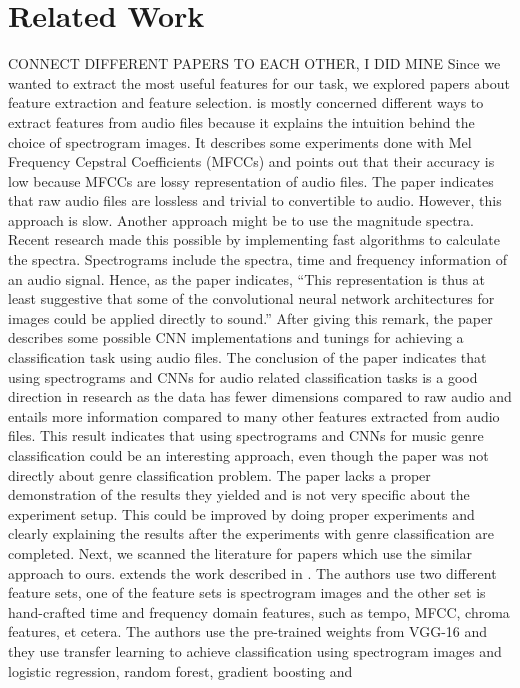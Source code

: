 \documentclass[acmtog, authorversion]{acmart}
\begin{document}
\section{Related Work}
CONNECT DIFFERENT PAPERS TO EACH OTHER, I DID MINE
Since we wanted to extract the most useful features for our task, we explored papers about feature extraction and feature selection. \cite{wyse2017audio} 
is mostly concerned different ways to extract features from audio files because it explains the intuition behind the choice of spectrogram images. 
It describes some experiments done with Mel Frequency Cepstral Coefficients (MFCCs) and points out that their accuracy is low because MFCCs are lossy 
representation of audio files. The paper indicates that raw audio files are lossless and trivial to convertible to audio. However, this approach is slow. 
Another approach might be to use the magnitude spectra. Recent research made this possible by implementing fast algorithms to calculate the spectra. 
Spectrograms include the spectra, time and frequency information of an audio signal. Hence, as the paper indicates, “This representation is thus at least 
suggestive that some of the convolutional neural network architectures for images could be applied directly to sound.” After giving this remark, the paper 
describes some possible CNN implementations and tunings for achieving a classification task using audio files. The conclusion of the paper indicates that 
using spectrograms and CNNs for audio related classification tasks is a good direction in research as the data has fewer dimensions compared to raw audio 
and entails more information compared to many other features extracted from audio files. This result indicates that using spectrograms and CNNs for music 
genre classification could be an interesting approach, even though the paper was not directly about genre classification problem. The paper lacks a proper 
demonstration of the results they yielded and is not very specific about the experiment setup. This could be improved by doing proper experiments and 
clearly explaining the results after the experiments with genre classification are completed.
Next, we scanned the literature for papers which use the similar approach to ours. \cite{bahuleyan2018music} extends 
the work described in \cite{wyse2017audio}. The authors use two different feature sets, 
one of the feature sets is spectrogram images and the other set is hand-crafted time and frequency domain features, such as tempo, MFCC, chroma features, 
et cetera. The authors use the pre-trained weights from VGG-16 \cite{simonyan2014very} and they use transfer learning to achieve classification using spectrogram images and logistic regression, random forest, gradient boosting and 
\end{document}
